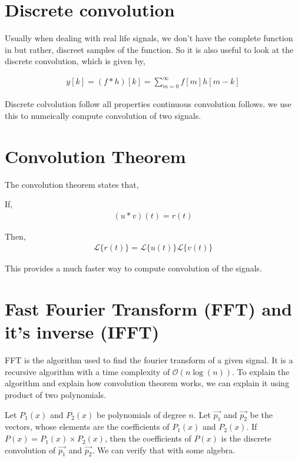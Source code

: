 \documentclass[12pt]{article}
\begin{document}
\section{Discrete convolution}

Usually when dealing with real life signals, we don't have the complete function in but rather, discreet samples of the function. So it is also useful to look at the discrete convolution, which is given by,

\begin{align*}
    y[k] = (f*h)[k] = \sum_{m=0}^{\infty} f[m]h[m-k]
\end{align*}

Discrete colvolution follow all properties continuous convolution follows. we use this to numeically compute convolution of two signals.

\section{Convolution Theorem}

The convolution theorem states that,

If,
\begin{align*}
    (u*v)(t) = r(t)
\end{align*}

Then,
\begin{align*}
    \mathcal{L}\{r(t)\} = \mathcal{L}\{u(t)\}\mathcal{L}\{v(t)\}
\end{align*}

This provides a much faster way to compute convolution of the signals.

\section{Fast Fourier Transform (FFT) and it's inverse (IFFT)}

FFT is the algorithm used to find the fourier transform of a given signal. It is a recursive algorithm with a time complexity of $\mathcal{O}(n\log(n))$. To explain the algorithm and explain how convolution theorem works, we can explain it using product of two polynomials.

Let $P_1(x)$ and $P_2(x)$ be polynomials of degree $n$. Let $\vec{p_1}$ and $\vec{p_2}$ be the vectors, whose elements are the coefficients of $P_1(x)$ and $P_2(x)$.
If $P(x) = P_1(x)\times P_2(x)$, then the coefficients of $P(x)$ is the discrete convolution of $\vec{p_1}$ and $\vec{p_2}$. We can verify that with some algebra.
\end{document}
